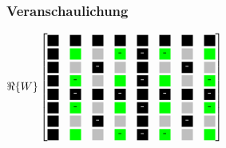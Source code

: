 \begin{frame}[t]\frametitle{Veranschaulichung}
\begin{minipage}{0.45\textwidth}
\begingroup
 \renewcommand*{\arraystretch}{0.8} %
   $\Re\{W\}
    \begin{bmatrix}
     \myboxOnePos 	& \myboxOnePos 		& \myboxOnePos 	& \myboxOnePos 		& \myboxOnePos 	& \myboxOnePos 		& \myboxOnePos 	& \myboxOnePos \\
     \myboxOnePos 	& \myboxSqrtPos 	& \myboxZero 	& \myboxSqrtNeg		& \myboxOneNeg	& \myboxSqrtNeg		& \myboxZero	& \myboxSqrtPos \\
     \myboxOnePos 	& \myboxZero 		& \myboxOneNeg 	& \myboxZero 		& \myboxOnePos 	& \myboxZero 		& \myboxOneNeg 	& \myboxZero \\
     \myboxOnePos 	& \myboxSqrtNeg 	& \myboxZero 	& \myboxSqrtPos 	& \myboxOneNeg 	& \myboxSqrtPos 	& \myboxZero 	& \myboxSqrtNeg \\
     \myboxOnePos 	& \myboxOneNeg 		& \myboxOnePos 	& \myboxOneNeg 		& \myboxOnePos 	& \myboxOneNeg 		& \myboxOnePos 	& \myboxOneNeg \\
     \myboxOnePos 	& \myboxSqrtNeg 	& \myboxZero 	& \myboxSqrtPos 	& \myboxOneNeg 	& \myboxSqrtPos 	& \myboxZero 	& \myboxSqrtNeg \\
     \myboxOnePos 	& \myboxZero 		& \myboxOneNeg 	& \myboxZero 		& \myboxOnePos 	& \myboxZero 		& \myboxOneNeg 	& \myboxZero \\
     \myboxOnePos 	& \myboxSqrtPos 	& \myboxZero 	& \myboxSqrtNeg		& \myboxOneNeg	& \myboxSqrtNeg		& \myboxZero	& \myboxSqrtPos 
    \end{bmatrix}
   $
   

\end{minipage}
\end{frame}
